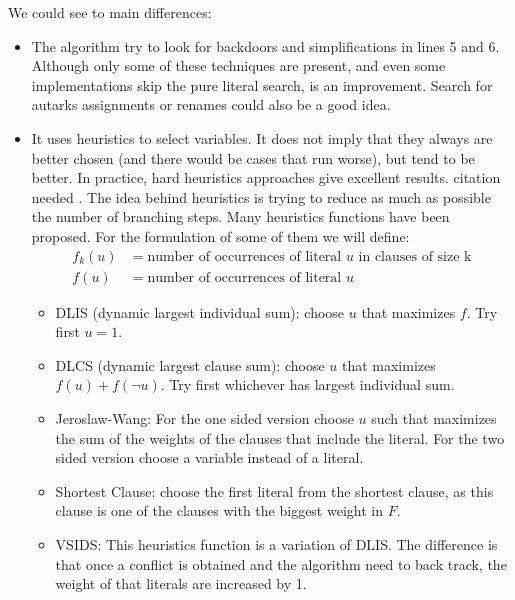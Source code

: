 We could see to main differences:
\begin{itemize}
\item The algorithm try to look for backdoors and simplifications in lines 5 and 6. Although only some of these techniques are present, and even some implementations skip the pure  literal search, is an improvement. Search for autarks assignments or renames could also be a good idea.

\item It uses heuristics to select variables. It does not imply that they always are better chosen  (and there would be cases that run worse), but tend to be better. In practice, hard heuristics approaches give excellent results. {\color{red} citation needed }. The idea behind heuristics is trying to reduce as much as possible the number of branching steps. Many heuristics functions have been proposed. For the formulation of some of them we will define:
  \begin{equation}
    \begin{split}
      f_k(u) & = \text{number of occurrences of literal } u \text{ in clauses of size k}\\
      f(u) & = \text{number of occurrences of literal } u
\end{split}
\end{equation}
  
  \begin{itemize}
  \item DLIS (dynamic largest individual sum): choose $u$ that maximizes $f$. Try first $u=1$.
  \item DLCS (dynamic largest clause sum):  choose $u$ that maximizes $f(u)+f(\neg u)$. Try first whichever has largest individual sum.
  \item Jeroslaw-Wang: For the one sided version choose $u$ such that maximizes the sum of the weights of the clauses that include the literal. For the two sided version choose a variable instead of a literal.
  \item Shortest Clause: choose the first literal from the shortest clause, as this clause is one of the clauses with the biggest weight in $F$.
  \item VSIDS: This heuristics function is a variation of DLIS. The difference is that once a conflict is obtained and the algorithm need to back track, the weight of that literals are increased by 1.
  \end{itemize}
\end{itemize}

